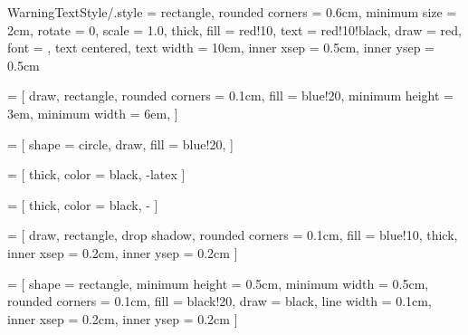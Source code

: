 \tikzset
{
	WarningTextStyle/.style =
	{
		rectangle,						%
		rounded corners	= 0.6cm,		%
		minimum size	= 2cm,			%
		rotate			= 0,			%
		scale			= 1.0,			%
		thick,							%
		fill			= red!10,		%
		text			= red!10!black,	%
		draw			= red,			%
		font			= \large,		%
		text centered,					%
		text width		= 10cm,			%
		inner xsep		= 0.5cm,		%
		inner ysep		= 0.5cm			%
	}
}




 =
[
	draw,
	rectangle,
	rounded corners	= 0.1cm,
	fill			= blue!20,
	minimum height	= 3em,
	minimum width	= 6em,
]





 =
[
	shape			= circle,
	draw,
	fill			= blue!20,
]




 =
[
	thick,
	color	= black,
	-latex
]




 =
[
	thick,
	color	= black,
	-
]




 =
[
	draw,
	rectangle,
	drop shadow,
	rounded corners	= 0.1cm,
	fill			= blue!10,
	thick,
	inner xsep		= 0.2cm,		%
	inner ysep		= 0.2cm			%
]



\tikzfading	%
[
	name			= middle,
	top color		= transparent!100,
	bottom color	= transparent!100,
	middle color	= transparent!00,
]



 =
[
	shape			= rectangle,
	minimum height	= 0.5cm,
	minimum width	= 0.5cm,
	rounded corners	= 0.1cm,
	fill			= black!20,
	draw			= black,
	line width		= 0.1cm,
	inner xsep		= 0.2cm,
	inner ysep		= 0.2cm
]
